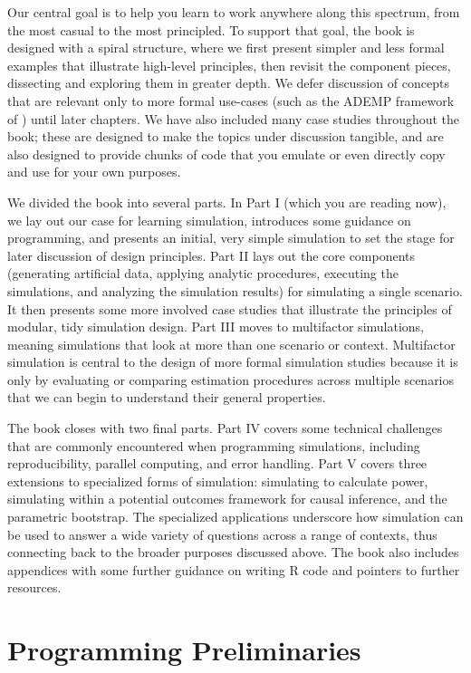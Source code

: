 \documentclass[
]{book}
\begin{document}
Our central goal is to help you learn to work anywhere along this spectrum, from the most casual to the most principled.
To support that goal, the book is designed with a spiral structure, where we first present simpler and less formal examples that illustrate high-level principles, then revisit the component pieces, dissecting and exploring them in greater depth.
We defer discussion of concepts that are relevant only to more formal use-cases (such as the ADEMP framework of \citet{morris2019UsingSimulationStudies}) until later chapters.
We have also included many case studies throughout the book; these are designed to make the topics under discussion tangible, and are also designed to provide chunks of code that you emulate or even directly copy and use for your own purposes.

We divided the book into several parts.
In Part I (which you are reading now), we lay out our case for learning simulation, introduces some guidance on programming, and presents an initial, very simple simulation to set the stage for later discussion of design principles.
Part II lays out the core components (generating artificial data, applying analytic procedures, executing the simulations, and analyzing the simulation results) for simulating a single scenario. It then presents some more involved case studies that illustrate the principles of modular, tidy simulation design.
Part III moves to multifactor simulations, meaning simulations that look at more than one scenario or context.
Multifactor simulation is central to the design of more formal simulation studies because it is only by evaluating or comparing estimation procedures across multiple scenarios that we can begin to understand their general properties.

The book closes with two final parts.
Part IV covers some technical challenges that are commonly encountered when programming simulations, including reproducibility, parallel computing, and error handling.
Part V covers three extensions to specialized forms of simulation: simulating to calculate power, simulating within a potential outcomes framework for causal inference, and the parametric bootstrap. The specialized applications underscore how simulation can be used to answer a wide variety of questions across a range of contexts, thus connecting back to the broader purposes discussed above.
The book also includes appendices with some further guidance on writing R code and pointers to further resources.

\chapter{Programming Preliminaries}\label{programming-preliminaries}
\end{document}
